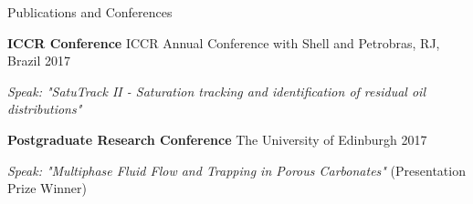 \documentclass{resume} %
\newenvironment{indentpar}[1]%
  {\begin{list}{}%
          {\setlength{\leftmargin}{#1}}%
          \item[]%
  }
  {\end{list}}
\begin{document}
\begin{rSection}{Publications and Conferences}
\begin{indentpar}{0.5cm}
\textbf{ICCR Conference} ICCR Annual Conference with Shell and Petrobras, RJ, Brazil \hfill {2017}
\begin{indentpar}{0.5cm}
\textit {Speak: "SatuTrack II - Saturation tracking and identification of residual oil distributions"}
\end{indentpar}

\textbf{Postgraduate Research Conference} The University of Edinburgh \hfill {2017} 
\begin{indentpar}{0.5cm}
\textit {Speak: "Multiphase Fluid Flow and Trapping in Porous Carbonates"} (Presentation Prize Winner)
\end{indentpar}
\end{indentpar}
\end{rSection}
\end{document}
